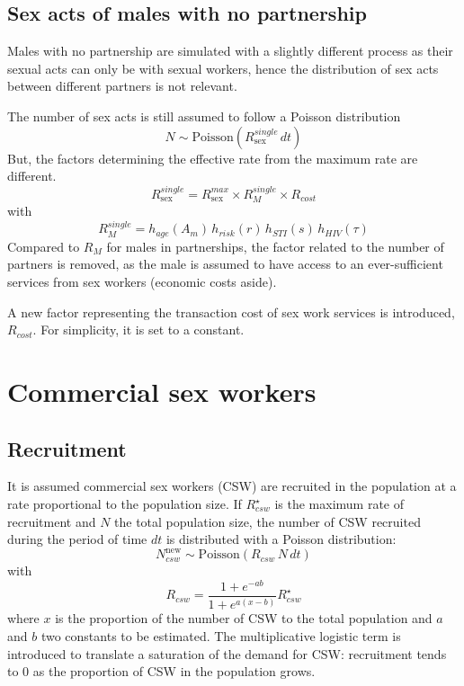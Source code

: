 \documentclass[11pt, onecolumn]{article}
\begin{document}
\subsection{Sex acts of males with no partnership}

Males with no partnership are simulated with a slightly different process as their sexual acts can only be with sexual workers, hence the distribution of sex acts between different partners is not relevant.

The number of sex acts is still assumed to follow a Poisson distribution
$$N\sim \mathrm{Poisson}(R_{\mathrm{sex}}^{single}\, dt)$$
But, the factors determining the effective rate from the maximum rate are different.
$$R_{\mathrm{sex}}^{single} = R_{\mathrm{sex}}^{max} \times R_{M}^{single} \times R_{cost} $$
with 
$$R_M^{single}= h_{age}(A_m)  \, h_{risk}(r) \,h_{STI}(s) \,h_{HIV}(\tau)  $$
Compared to $R_M$ for males in partnerships, the factor related to the number of partners is removed, as the male is assumed to have access to an ever-sufficient services from sex workers (economic costs aside).

A new factor representing the transaction cost of sex work services is introduced, $R_{cost}$. For simplicity, it is set to a constant. 




\section{Commercial sex workers}

\subsection{Recruitment}

It is assumed commercial sex workers (CSW) are recruited in the population at a rate proportional to the population size. If $R_{csw}^{\star}$ is the maximum rate of recruitment and $N$ the total population size, the number of CSW recruited during the period of time $dt$ is distributed with a Poisson distribution:
$$N_{csw}^{\mathrm{new}} \sim \text{Poisson}\left(R_{csw}\,N\,dt\right)$$
with 
$$ R_{csw} = \frac{1+e^{-ab}}{1+e^{a(x-b)}}R_{csw}^{\star}$$
where $x$ is the proportion of the number of CSW to the total population and $a$ and $b$ two constants to be estimated. The multiplicative logistic term is introduced to translate a saturation of the demand for CSW: recruitment tends to 0 as the proportion of CSW in the population grows.
\end{document}

